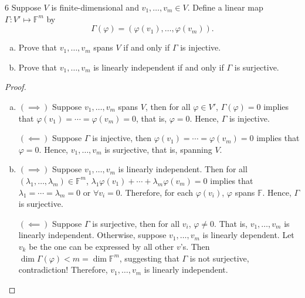 \documentclass{article}
\newenvironment{problem}[1]{\begin{prob*}{#1}{}}{\end{prob*}}
\begin{document}
\begin{problem}{6}
Suppose $V$ is finite-dimensional and $v_1, \ldots , v_m \in V$. Define a linear map $\Gamma : V' \mapsto \mathbb{F}^{m}$ by \[
	\Gamma(\varphi) = (\varphi(v_1), \ldots , \varphi(v_m)).\]
\begin{enumerate}[(a)]
\item Prove that $v_1, \ldots , v_m$ spans $V$ if and only if $\Gamma$ is injective.
\item Prove that $v_1, \ldots , v_m$ is linearly independent if and only if $\Gamma$ is surjective.
\end{enumerate}
\end{problem}
\begin{proof}
\begin{enumerate}[(a)]
\item $(\implies)$ Suppose $v_1, \ldots, v_m$ spans $V$, then for all $\varphi \in V'$, $\Gamma(\varphi) = 0$ implies that $\varphi(v_1) = \cdots = \varphi(v_m) = 0$, that is, $\varphi = 0$. Hence, $\Gamma$ is injective. \par
$(\impliedby)$ Suppose $\Gamma$ is injective, then $\varphi(v_1) = \cdots = \varphi(v_m) = 0$ implies that $\varphi = 0$. Hence, $v_1, \ldots , v_m$ is surjective, that is, spanning $V$.
\item $(\implies)$ Suppose $v_1, \ldots , v_m$ is linearly independent. Then for all $(\lambda_1, \ldots , \lambda_m) \in \mathbb{F}^m$, $\lambda_1\varphi(v_1) + \cdots + \lambda_m\varphi(v_m) = 0$ implies that $\lambda_1 = \cdots = \lambda_m = 0$ or $\forall v_i = 0$. Therefore, for each $\varphi(v_i)$, $\varphi$ spans $\mathbb{F}$. Hence, $\Gamma$ is surjective. \par
$(\impliedby)$ Suppose $\Gamma$ is surjective, then for all $v_i$, $\varphi \neq 0.$ That is, $v_1, \ldots , v_m$ is linearly independent. Otherwise, suppose $v_1, \ldots ,v_m$ is linearly dependent. Let $v_k$ be the one can be expressed by all other $v$'s. Then $\operatorname{dim}\Gamma(\varphi) < m = \operatorname{dim} \mathbb{F}^m$, suggesting that $\Gamma$ is not surjective, contradiction! Therefore, $v_1, \ldots ,v_m$ is linearly independent.
\end{enumerate}
\end{proof}

\end{document}
